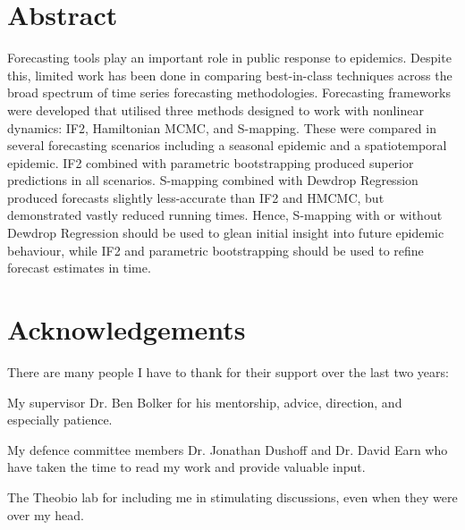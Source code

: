 \documentclass[12pt]{report}
\makeatletter
\let\org@subfile
\renewcommand*{}[1]{%
  \filename@parse{#1}%
  \expandafter
  \graphicspath\expandafter{\expandafter{\filename@area}}%
  \org@subfile{#1}%
}
\makeatother
\begin{document}
	


	

	\setcounter{page}{1}


	


	\chapter*{Abstract}

		Forecasting tools play an important role in public response to epidemics. Despite this, limited work has been done in comparing best-in-class techniques across the broad spectrum of time series forecasting methodologies. Forecasting frameworks were developed that utilised three methods designed to work with nonlinear dynamics: IF2, Hamiltonian MCMC, and S-mapping. These were compared in several forecasting scenarios including a seasonal epidemic and a spatiotemporal epidemic. IF2 combined with parametric bootstrapping produced superior predictions in all scenarios. S-mapping combined with Dewdrop Regression produced forecasts slightly less-accurate than IF2 and HMCMC, but demonstrated vastly reduced running times. Hence, S-mapping with or without Dewdrop Regression should be used to glean initial insight into future epidemic behaviour, while IF2 and parametric bootstrapping should be used to refine forecast estimates in time.


	\chapter*{Acknowledgements}

		There are many people I have to thank for their support over the last two years:

		My supervisor Dr. Ben Bolker for his mentorship, advice, direction, and especially patience.

		My defence committee members Dr. Jonathan Dushoff and Dr. David Earn who have taken the time to read my work and provide valuable input.

		The Theobio lab for including me in stimulating discussions, even when they were over my head.
\end{document}
